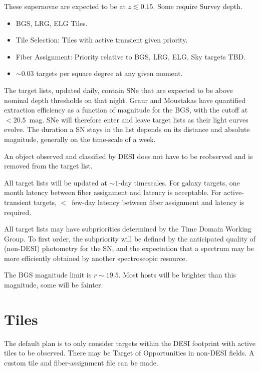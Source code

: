 \documentclass[11pt, oneside]{article}   	%
\begin{document}
\begin{itemize}
These supernovae are expected to be at $z \lesssim 0.15$.  Some require Survey depth.
\begin{itemize}
\item BGS, LRG, ELG Tiles.
\item Tile Selection: Tiles with active transient given priority.
\item Fiber Assignment: Priority relative to BGS, LRG, ELG, Sky targets TBD.
\item $\sim 0.03$ targets per square degree at any given moment.
\end{itemize}
The target lists, updated daily, contain SNe that are expected to be above nominal depth thresholds on that night.
 Graur and Moustakas have quantified extraction efficiency as a function
of magnitude for the BGS, with the cutoff at   $<20.5$~mag.
SNe will therefore enter and leave target lists as their light curves evolve. 
The duration a SN stays in the list depends on its distance
and absolute magnitude, generally on the time-scale of a week.

An object observed and classified by DESI does not have to be reobserved and is removed from the target list.
\end{itemize}

All target lists will be updated at $\sim 1$-day timescales.  For galaxy targets, one month latency between fiber assignment and latency is acceptable.
 For active-transient targets, $<$~few-day latency between fiber assignment and latency is required.

All target lists may have subpriorities determined by the Time Domain Working Group.  To first order, the subpriority will be defined by the
anticipated quality of (non-DESI)  photometry for the SN, and the expectation that a spectrum may be more efficiently obtained by another
spectroscopic resource.

The BGS magnitude limit is $r \sim 19.5$.  Most hosts will be brighter than this magnitude, some will be fainter.

\section{Tiles}
The default plan is to only consider targets within the DESI footprint with active tiles to be observed.  There may be Target
of Opportunities in non-DESI fields.  A custom tile and fiber-assignment file can be made.
\end{document}
